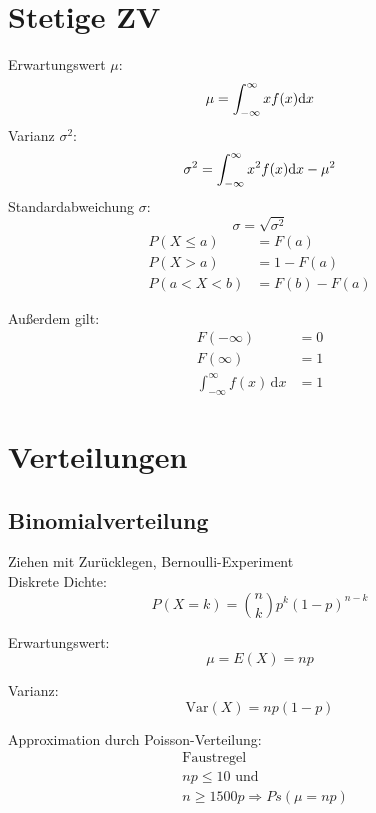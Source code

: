 \clearpage

\section{Stetige ZV}
Erwartungswert $\mu$:
\begin{equation}
	\mu = \int_{-\infty}^{\infty}xf(x)\mathrm{d}x\\
\end{equation}
Varianz $\sigma^2$:
\begin{equation}
	\sigma^2 = \int_{-\infty}^{\infty}x^2f(x)\mathrm{d}x-\mu^2\\
\end{equation}
Standardabweichung $\sigma$:
\begin{equation}
	\sigma = \sqrt{\sigma^2}
\end{equation}
\begin{align}
	P(X\leq a) &= F(a)\\
	P(X > a) &= 1 - F(a)\\
	P(a < X < b) &= F(b) - F(a)
\end{align}

Außerdem gilt:
\begin{align}
	F(-\infty) &= 0\\
	F(\infty) &= 1\\
	\int_{-\infty}^\infty\!f(x)\, \mathrm{d}x &= 1
\end{align}

\clearpage

\section{Verteilungen}
\subsection{Binomialverteilung}
\large{Ziehen mit Zurücklegen, Bernoulli-Experiment}\\
Diskrete Dichte:
\begin{equation}
	P(X=k) = \binom{n}{k}p^k(1-p)^{n-k}
\end{equation}

Erwartungswert:
\begin{equation}
	\mu = E(X) = np
\end{equation}

Varianz:
\begin{equation}
	\text{Var}(X)=np(1-p)
\end{equation}

Approximation durch Poisson-Verteilung:
\begin{align*}
	& \text{Faustregel} \\
	& np \leq 10 \text{ und} \\
	& n \geq 1500p \Rightarrow Ps(\mu = np) 
\end{align*}

